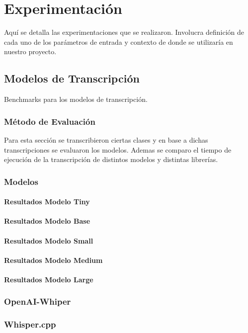 \documentclass{../../prgrado}
\begin{document}


\chapter{Experimentación}
Aquí se detalla las experimentaciones que se realizaron. 
Involucra definición de cada uno de los parámetros de entrada y \gls{contexto} de donde se utilizaría en nuestro proyecto. 

\section{Modelos de Transcripción}
Benchmarks para los modelos de transcripción.
\subsection{Método de Evaluación}
Para esta sección se transcribieron ciertas clases y en base a dichas transcripciones se evaluaron los modelos. Ademas se comparo el tiempo de ejecución de la transcripción de distintos modelos y distintas librerías. 

\subsection{Modelos}
\subsubsection{Resultados Modelo Tiny}
\subsubsection{Resultados Modelo Base}
\subsubsection{Resultados Modelo Small}
\subsubsection{Resultados Modelo Medium}
\subsubsection{Resultados Modelo Large}
\subsection{OpenAI-Whiper}
\subsection{Whisper.cpp}
\end{document}
